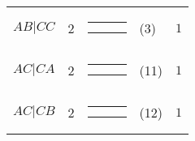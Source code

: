 \begin{center}
\begin{tabular}{ccrlc}
$AB|CC$ & 2 & 
{\renewcommand{\arraystretch}{0.3}
\renewcommand{\tabcolsep}{0.5mm}
\parbox[b][3mm][c]{12mm}{
\begin{tabular}{|p{2mm}|p{2mm}||p{2mm}|} \hline
$\bullet$ &           & $\circ  $ \\
          & $\bullet$ & $\circ  $ \\ \hline
\end{tabular}}}
& (3) & $1$ \\
$AC|CA$ & 2 & 
{\renewcommand{\arraystretch}{0.3}
\renewcommand{\tabcolsep}{0.5mm}
\parbox[b][3mm][c]{12mm}{
\begin{tabular}{|p{2mm}|p{2mm}||p{2mm}|} \hline
$\bullet$ &           & $\circ  $ \\
$\circ  $ &           & $\bullet$ \\ \hline
\end{tabular}}}
& (11) & $1$ \\
$AC|CB$ & 2 & 
{\renewcommand{\arraystretch}{0.3}
\renewcommand{\tabcolsep}{0.5mm}
\parbox[b][3mm][c]{12mm}{
\begin{tabular}{|p{2mm}|p{2mm}||p{2mm}|} \hline
$\bullet$ &           & $\circ  $ \\
          & $\circ  $ & $\bullet$ \\ \hline
\end{tabular}}}
& (12) & $1$ \\
\hline
\end{tabular}
\end{center}
